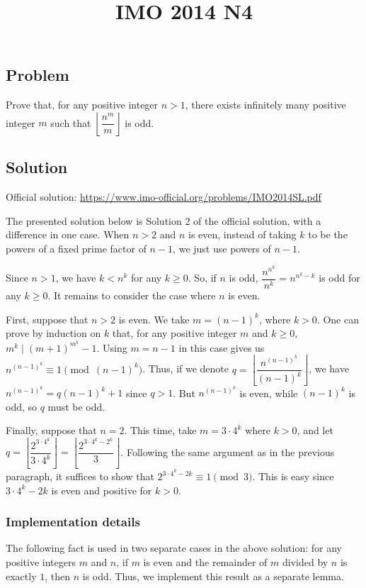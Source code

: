 \documentclass{article}
\title{IMO 2014 N4}
\author{}
\date{}
\begin{document}
\maketitle



\subsection*{Problem}

Prove that, for any positive integer $n > 1$, there exists infinitely many positive integer $m$ such that $\left\lfloor \dfrac{n^m}{m} \right\rfloor$ is odd.



\subsection*{Solution}

Official solution: \url{https://www.imo-official.org/problems/IMO2014SL.pdf}

The presented solution below is Solution 2 of the official solution, with a difference in one case.
When $n > 2$ and $n$ is even, instead of taking $k$ to be the powers of a fixed prime factor of $n - 1$, we just use powers of $n - 1$.

Since $n > 1$, we have $k < n^k$ for any $k \geq 0$.
So, if $n$ is odd, $\dfrac{n^{n^k}}{n^k} = n^{n^k - k}$ is odd for any $k \geq 0$.
It remains to consider the case where $n$ is even.

First, suppose that $n > 2$ is even.
We take $m = (n - 1)^k$, where $k > 0$.
One can prove by induction on $k$ that, for any positive integer $m$ and $k \geq 0$, $m^k \mid (m + 1)^{m^k} - 1$.
Using $m = n - 1$ in this case gives us $n^{(n - 1)^k} \equiv 1 \pmod{(n - 1)^k}$.
Thus, if we denote $q = \left\lfloor \dfrac{n^{(n - 1)^k}}{(n - 1)^k} \right\rfloor$, we have $n^{(n - 1)^k} = q (n - 1)^k + 1$ since $q > 1$.
But $n^{(n - 1)^k}$ is even, while $(n - 1)^k$ is odd, so $q$ must be odd.

Finally, suppose that $n = 2$.
This time, take $m = 3 \cdot 4^k$ where $k > 0$, and let $q = \left\lfloor \dfrac{2^{3 \cdot 4^k}}{3 \cdot 4^k} \right\rfloor = \left\lfloor \dfrac{2^{3 \cdot 4^k - 2^k}}{3} \right\rfloor$.
Following the same argument as in the previous paragraph, it suffices to show that $2^{3 \cdot 4^k - 2k} \equiv 1 \pmod{3}$.
This is easy since $3 \cdot 4^k - 2k$ is even and positive for $k > 0$.



\subsubsection*{Implementation details}

The following fact is used in two separate cases in the above solution:
    for any positive integers $m$ and $n$, if $m$ is even and the remainder of $m$ divided by $n$ is exactly $1$, then $n$ is odd.
Thus, we implement this result as a separate lemma.
\end{document}
